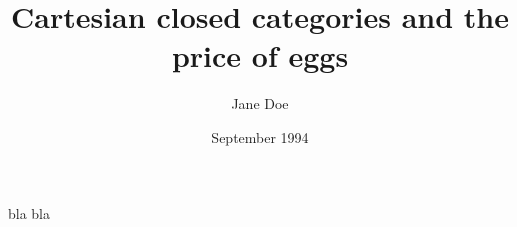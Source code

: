 \documentclass{article}
\title{Cartesian closed categories and the price of eggs}
\author{Jane Doe}
\date{September 1994}
\begin{document}
    \maketitle
    bla bla
    \cite{template}
    
    
\end{document}
